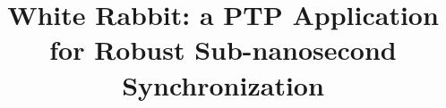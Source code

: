 \documentclass[conference]{IEEEtran}
\begin{document}
\title{White Rabbit: a PTP Application for Robust Sub-nanosecond Synchronization}



\maketitle






%







%





%



\end{document}
